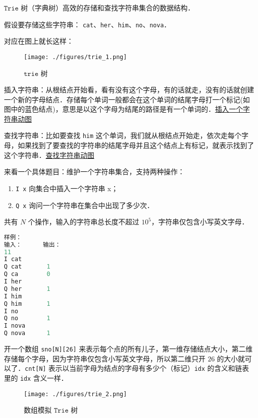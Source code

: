 
$\mathtt{Trie}$ 树（字典树）高效的存储和查找字符串集合的数据结构．

假设要存储这些字符串：
\verb|cat|、\verb|her|、\verb|him|、\verb|no|、\verb|nova|．

对应在图上就长这样：\begin{figure}[ht]
\centering
\texttt{[image: ./figures/trie\_1.png]}
\caption{$\mathtt{trie}$ 树} \label{trie_fig1}
\end{figure}

插入字符串：从根结点开始看，看有没有这个字母，有的话就走，没有的话就创建一个新的字母结点．存储每个单词一般都会在这个单词的结尾字母打一个标记(如图中的蓝色结点)，意思是以这个字母为结尾的路径是有一个单词的．\href{https://pic2.zhimg.com/v2-cb9b476f3856b7ae68a00af6911c07a9_b.gif}{插入一个字符串动图}

查找字符串：比如要查找 \verb|him| 这个单词，我们就从根结点开始走，依次走每个字母，如果找到了要查找的字符串的结尾字母并且这个结点上有标记，就表示找到了这个字符串．\href{https://pic2.zhimg.com/v2-98c24afcfc74582fdc54c7381d29d639_b.gif}{查找字符串动图}

来看一个具体题目：维护一个字符串集合，支持两种操作：

\begin{enumerate}
\item \verb|I x| 向集合中插入一个字符串 x；
\item \verb|Q x| 询问一个字符串在集合中出现了多少次．
\end{enumerate}
共有 $N$ 个操作，输入的字符串总长度不超过 $10^5$，字符串仅包含小写英文字母．

\begin{lstlisting}[language=cpp]
样例：
输入：      输出：
11
I cat       
Q cat       1
Q ca        0
I her
Q her       1
I him
Q him       1
I no 
Q no        1
I nova
Q nova      1
\end{lstlisting}

开一个数组 \verb|sno[N][26]| 来表示每个点的所有儿子，第一维存储结点大小，第二维存储每个字母，因为字符串仅包含小写英文字母，所以第二维只开 $26$ 的大小就可以了．\verb|cnt[N]| 表示以当前字母为结点的字母有多少个（标记）\verb|idx| 的含义和链表里的 \verb|idx| 含义一样．

\begin{figure}[ht]
\centering
\texttt{[image: ./figures/trie\_2.png]}
\caption{数组模拟 $\mathtt{Trie}$ 树} \label{trie_fig2}
\end{figure}

